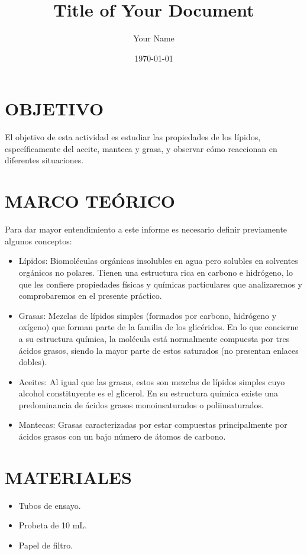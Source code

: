 \documentclass{article}
\begin{document}
\title{Title of Your Document}
\author{Your Name}
\date{\today}
\maketitle

\section{OBJETIVO}
El objetivo de esta actividad es estudiar las propiedades de los lípidos, específicamente del aceite, manteca y grasa, y observar cómo reaccionan en diferentes situaciones.

\section{MARCO TEÓRICO}
Para dar mayor entendimiento a este informe es necesario definir previamente algunos conceptos:

\begin{itemize}
    \item Lípidos: Biomoléculas orgánicas insolubles en agua pero solubles en solventes orgánicos no polares. Tienen una estructura rica en carbono e hidrógeno, lo que les confiere propiedades físicas y químicas particulares que analizaremos y comprobaremos en el presente práctico.
    
    \item Grasas: Mezclas de lípidos simples (formados por carbono, hidrógeno y oxígeno) que forman parte de la familia de los glicéridos. En lo que concierne a su estructura química, la molécula está normalmente compuesta por tres ácidos grasos, siendo la mayor parte de estos saturados (no presentan enlaces dobles).
    
    \item Aceites: Al igual que las grasas, estos son mezclas de lípidos simples cuyo alcohol constituyente es el glicerol. En su estructura química existe una predominancia de ácidos grasos monoinsaturados o poliinsaturados.
    
    \item Mantecas: Grasas caracterizadas por estar compuestas principalmente por ácidos grasos con un bajo número de átomos de carbono.
\end{itemize}

\section{MATERIALES}
\begin{itemize}
    \item Tubos de ensayo.
    \item Probeta de 10 mL.
    \item Papel de filtro.
\end{itemize}
\end{document}
